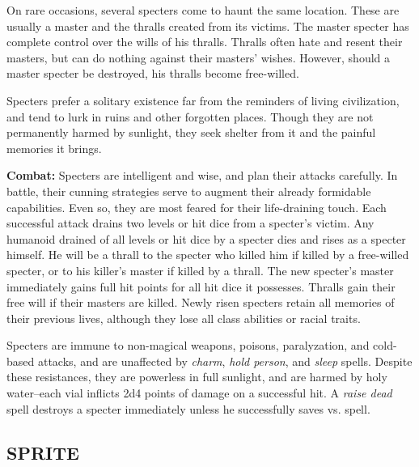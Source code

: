 \begin{multicols}{2}
On rare occasions, several specters come to haunt the same location. These are usually a master and the thralls created from its victims. The master specter has complete control over the wills of his thralls. Thralls often hate and resent their masters, but can do nothing against their masters' wishes. However, should a master specter be destroyed, his thralls become free-willed.

Specters prefer a solitary existence far from the reminders of living civilization, and tend to lurk in ruins and other forgotten places. Though they are not permanently harmed by sunlight, they seek shelter from it and the painful memories it brings.

\textbf{Combat:} Specters are intelligent and wise, and plan their attacks carefully. In battle, their cunning strategies serve to augment their already formidable capabilities. Even so, they are most feared for their life-draining touch. Each successful attack drains two levels or hit dice from a specter's victim. Any humanoid drained of all levels or hit dice by a specter dies and rises as a specter himself. He will be a thrall to the specter who killed him if killed by a free-willed specter, or to his killer's master if killed by a thrall. The new specter's master immediately gains full hit points for all hit dice it possesses. Thralls gain their free will if their masters are killed. Newly risen specters retain all memories of their previous lives, although they lose all class abilities or racial traits.

Specters are immune to non-magical weapons, poisons, paralyzation, and cold-based attacks, and are unaffected by \textit{charm}, \textit{hold person}, and \textit{sleep} spells. Despite these resistances, they are powerless in full sunlight, and are harmed by holy water--each vial inflicts 2d4 points of damage on a successful hit. A \textit{raise dead} spell destroys a specter immediately unless he successfully saves vs. spell.

\noindent
\begin{minipage}{\columnwidth}

\vspace{1em}

\subsection{SPRITE}


\end{minipage}
\end{multicols}
